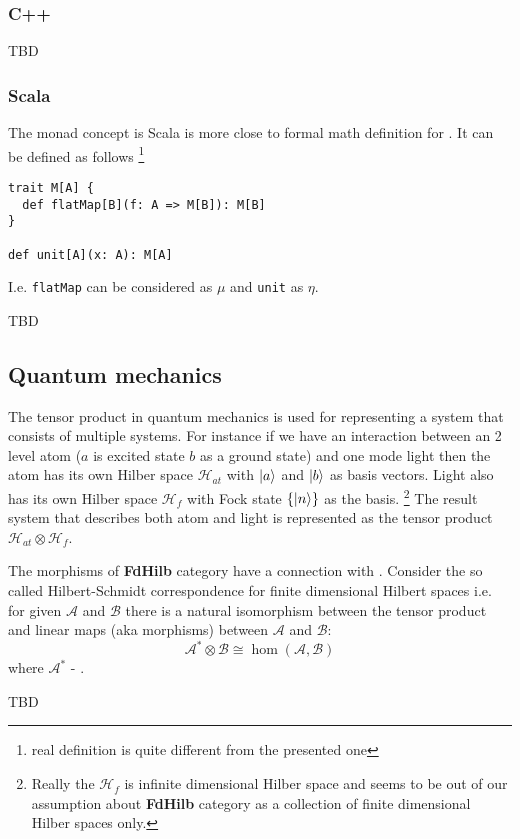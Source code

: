\subsubsection{C++}

TBD

\subsubsection{Scala}

\begin{example}
The monad concept is Scala is more close to formal math definition for
. It can be defined as follows 
\footnote{real definition is quite different from the presented one}
\label{ex:monad_scala}
\begin{verbatim}
trait M[A] {
  def flatMap[B](f: A => M[B]): M[B]
}
  
def unit[A](x: A): M[A]
\end{verbatim} 
I.e. \texttt{flatMap} can be considered as $\mu$ and
\texttt{unit} as $\eta$. 
\end{example}

TBD

\subsection{Quantum mechanics}

The tensor product in quantum mechanics is used for
representing a system that consists of multiple systems. For instance
if we have an interaction between an 2 level atom ($a$ is excited
state $b$ as a ground state) and one mode light then the
atom has its own Hilber space $\mathcal{H}_{at}$ with $\ket{a}$ and
$\ket{b}$ as basis 
vectors.  Light also has its own Hilber space $\mathcal{H}_f$ with Fock state
$\{\ket{n}\}$ as the basis.
\footnote{
  Really the $\mathcal{H}_f$ is infinite dimensional Hilber space and
  seems to be out of our assumption about \textbf{FdHilb} category as
  a collection of finite dimensional Hilber spaces only.
}
The result system that describes both atom
and light is represented as the tensor product $\mathcal{H}_{at}
\otimes \mathcal{H}_f$.

The morphisms of \textbf{FdHilb} category have a connection with
. Consider the so called Hilbert-Schmidt
correspondence for finite dimensional Hilbert spaces i.e. for given
$\mathcal{A}$ and $\mathcal{B}$ there is a natural isomorphism between
the tensor product and linear maps (aka morphisms) between
$\mathcal{A}$ and $\mathcal{B}$:
\[
\mathcal{A}^\ast \otimes \mathcal{B} \cong \hom(\mathcal{A}, \mathcal{B})
\]
where $\mathcal{A}^\ast$ - .


TBD
